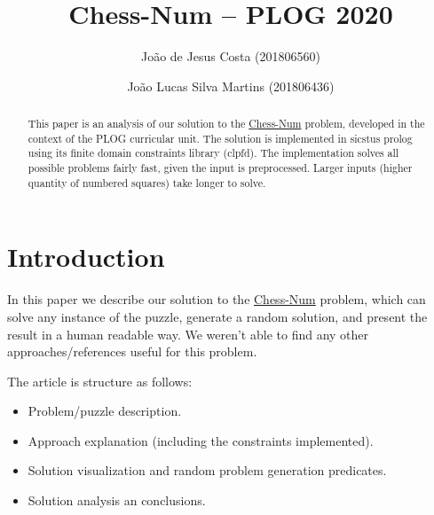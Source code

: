 \documentclass[runningheads]{llncs}
\title{Chess-Num -- PLOG 2020}
\author{João de Jesus Costa (201806560) \and João Lucas Silva Martins (201806436)}
\institute{FEUP, UPorto}
\begin{document}
\maketitle

\begin{abstract}
This paper is an analysis of our solution to the  \href{https://erich-friedman.github.io/puzzle/chessnum/}{Chess-Num}
problem, developed in the context of the PLOG curricular unit. The solution is
implemented in sicstus prolog using its finite domain constraints library (clpfd).
The implementation solves all possible problems fairly fast, given the input
is preprocessed. Larger inputs (higher quantity of numbered squares) take longer
to solve.

\end{abstract}

\section{Introduction}
In this paper we describe our solution to the \href{https://erich-friedman.github.io/puzzle/chessnum/}{Chess-Num}
problem, which can solve any instance of the puzzle, generate a random solution, and
present the result in a human readable way. We weren't able to find any other
approaches/references useful for this problem.

The article is structure as follows:
\begin{itemize}
  \item Problem/puzzle description.
  \item Approach explanation (including the constraints implemented).
  \item Solution visualization and random problem generation predicates.
  \item Solution analysis an conclusions.
\end{itemize}
\end{document}
